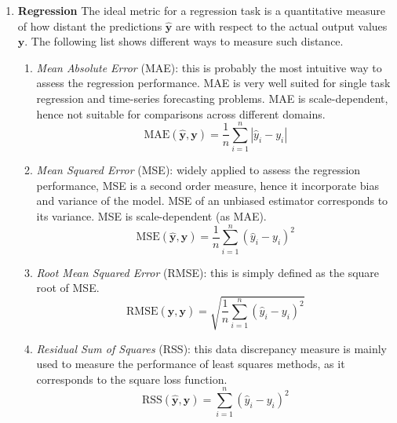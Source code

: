     \begin{enumerate}
    	\item[] \textbf{Regression}
    	The ideal metric for a regression task is a quantitative measure of how distant the predictions $\bm{\hat  y}$ are with respect to the actual output values $\bm{y}$. The following list shows different ways to measure such distance.
    	\begin{enumerate}[label=(\roman*)]
    		\item \textit{Mean Absolute Error} (\ac{MAE}): this is probably the most intuitive way to assess the regression performance. MAE is very well suited for single task regression and time-series forecasting problems. MAE is scale-dependent, hence not suitable for comparisons across different domains.
    		\begin{equation} \label{eq:metrics_mae}
    			\text{MAE}(\bm{\hat y}, \bm{y}) = \frac{1}{n}\sum_{i=1}^n|\hat y_i - y_i|
    		\end{equation}
    		
    		\item \textit{Mean Squared Error} (\ac{MSE}): widely applied to assess the regression performance, MSE is a second order measure, hence it incorporate bias and variance of the model. MSE of an unbiased estimator corresponds to its variance. MSE is scale-dependent (as MAE).
    		\begin{equation} \label{eq:metrics_mse}
	   			\text{MSE}(\bm{\hat y}, \bm{y}) = \frac{1}{n}\sum_{i=1}^n(\hat y_i - y_i)^2
    		\end{equation}
    		
    		\item \textit{Root Mean Squared Error} (\ac{RMSE}): this is simply defined as the square root of MSE.
    		\begin{equation} \label{eq:metrics_rmse}
    			\text{RMSE}(\bm{\hat y}, \bm{y}) = \sqrt{\frac{1}{n}\sum_{i=1}^n(\hat y_i - y_i)^2}
    		\end{equation}

    		\item \textit{Residual Sum of Squares} (\ac{RSS}): this data discrepancy measure is mainly used to measure the performance of least squares methods, as it corresponds to the square loss function.
    		\begin{equation} \label{eq:metrics_rss}
    			\text{RSS}(\bm{\hat y}, \bm{y}) = \sum_{i=1}^n(\hat y_i - y_i)^2
    		\end{equation}
    		

\end{enumerate}
\end{enumerate}

